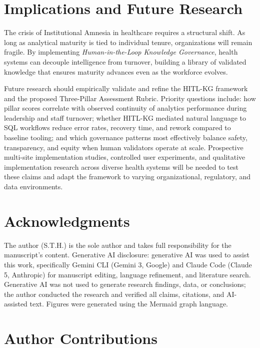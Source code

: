 \documentclass[
  american,
  11pt,
  letterpaper,
  oneside  ,captions=tableheading
]{scrartcl}
\begin{document}
\section{Implications and Future
Research}\label{implications-and-future-research}

The crisis of Institutional Amnesia in healthcare requires a structural
shift. As long as analytical maturity is tied to individual tenure,
organizations will remain fragile. By implementing
\emph{Human-in-the-Loop Knowledge Governance}, health systems can
decouple intelligence from turnover, building a library of validated
knowledge that ensures maturity advances even as the workforce evolves.

Future research should empirically validate and refine the HITL-KG
framework and the proposed Three-Pillar Assessment Rubric. Priority
questions include: how pillar scores correlate with observed continuity
of analytics performance during leadership and staff turnover; whether
HITL-KG mediated natural language to SQL workflows reduce error rates,
recovery time, and rework compared to baseline tooling; and which
governance patterns most effectively balance safety, transparency, and
equity when human validators operate at scale. Prospective multi-site
implementation studies, controlled user experiments, and qualitative
implementation research across diverse health systems will be needed to
test these claims and adapt the framework to varying organizational,
regulatory, and data environments.

\section{Acknowledgments}\label{acknowledgments}

The author (S.T.H.) is the sole author and takes full responsibility for
the manuscript's content. Generative AI disclosure: generative AI was
used to assist this work, specifically Gemini CLI (Gemini 3, Google) and
Claude Code (Claude 5, Anthropic) for manuscript editing, language
refinement, and literature search. Generative AI was not used to
generate research findings, data, or conclusions; the author conducted
the research and verified all claims, citations, and AI-assisted text.
Figures were generated using the Mermaid graph language.

\section{Author Contributions}\label{author-contributions}
\end{document}
